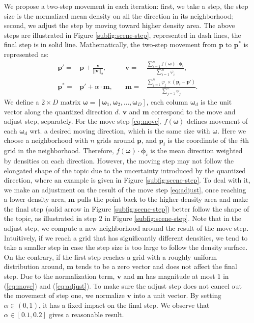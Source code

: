     We propose a two-step movement in each iteration: first, we take a step, the step size is the normalized mean density on all the direction in its neighborhood; second, we adjust the step by moving toward higher density area. 
    The above steps are illustrated in Figure \ref{subfig:scene-step}, represented in dash lines, the final step is in solid line. 
    Mathematically, the two-step movement from $\bm{p}$ to $\bm{p^*}$ is represented as:
    \begin{align}
        \bm{p}' =&\bm{p} + \frac{\bm{v}}{||\bm{v}||_2}, \quad
        & \bm{v} = & \frac{\sum_{i=1}^n{ f(\bm{\omega})\cdot\bm{\phi}_i}}{{\sum_{i=1}^n{\varphi_i}}}, \label{eq:move}\\
        \bm{p}^* =& \bm{p}' + \alpha\cdot \bm{m}, \quad
        & \bm{m} = &\frac{\sum_{j=1}^n{\varphi_j\times(\bm{p}_i-\bm{p}')}}{\sum_{j=1}^n{\varphi_j}}.\label{eq:adjust}
    \end{align}
    We define a $2\times D$ matrix $\bm{\omega} = [\bm{\omega}_1, \bm{\omega}_2, \dots, \bm{\omega}_D]$, each column $\bm{\omega}_{d}$ is the unit vector along the quantized direction $d$.
    $\bm{v}$ and $\bm{m}$ correspond to the move and adjust step, separately. 
    For the move step \ref{eq:move}, $f(\bm{\omega})$ defines movement of each $\bm{\omega}_d$ wrt. a desired moving direction, which is the same size with $\bm{\omega}$. 
    Here we choose a neighborhood with $n$ grids around $\bm{p}$, and $\bm{p}_{i}$ is the coordinate of the $i$th grid in the neighborhood. 
    Therefore, $f(\bm{\omega})\cdot\bm{\phi}_i$ is the mean direction weighted by densities on each direction. 
    However, the moving step may not follow the elongated shape of the topic due to the uncertainty introduced by the quantized direction, where an example is given in Figure \ref{subfig:scene-step}. 
    To deal with it, we make an adjustment on the result of the move step \ref{eq:adjust}, once reaching a lower density area, $\bm{m}$ pulls the point back to the higher-density area and make the final step (solid arrow in Figure \ref{subfig:scene-step}) better follow the shape of the topic, as illustrated in step 2 in Figure \ref{subfig:scene-step}.
    Note that in the adjust step, we compute a new neighborhood around the result of the move step.
    Intuitively, if we reach a grid that has significantly different densities, we tend to take a smaller step in case the step size is too large to follow the density surface. 
    On the contrary, if the first step reaches a grid with a roughly uniform distribution around, $\bm{m}$ tends to be a zero vector and does not affect the final step.
    Due to the normalization term, $\bm{v}$ and $\bm{m}$ has magnitude at most $1$ in (\ref{eq:move}) and (\ref{eq:adjust}). 
    To make sure the adjust step does not cancel out the movement of step one, we normalize $\bm{v}$ into a unit vector. By setting $\alpha\in(0,1)$, it has a fixed impact on the final step. We observe that $\alpha\in[0.1,0.2]$ gives a reasonable result.

